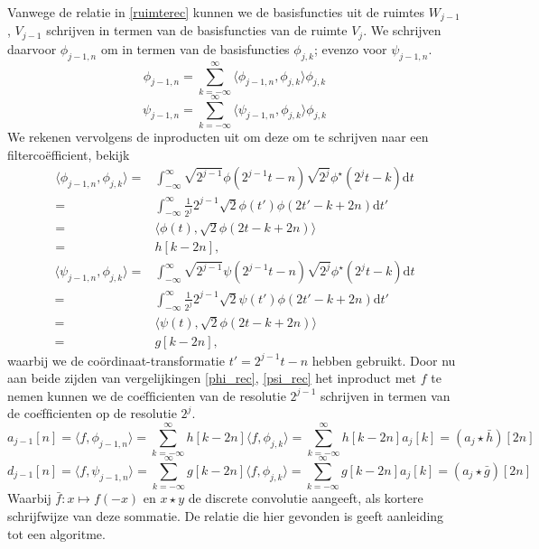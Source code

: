 \documentclass[11pt]{report}
\theoremstyle{plain}
\theoremstyle{remark}
\newcommand{\eq}[1]{\begin{eqnarray*} #1 \end{eqnarray*}}
\newcommand{\inpr}[2]{\langle #1 , #2 \rangle}
\renewcommand{\d}[1]{{\textrm{d} #1}}
\begin{document}
Vanwege de relatie in \ref{ruimterec} kunnen we de basisfuncties uit de ruimtes $W_{j-1}$,
$V_{j-1}$ schrijven in termen van de basisfuncties van de ruimte $V_j$.
We schrijven daarvoor $\phi_{j-1,n}$ om in termen van de basisfuncties $\phi_{j,k}$; evenzo
voor $\psi_{j-1,n}$.
\begin{equation}
\label{phi_rec}
\phi_{j-1,n} = \sum_{k=-\infty}^{\infty} \inpr{\phi_{j-1,n}}{\phi_{j,k}} \phi_{j,k}
\end{equation}
\begin{equation}
\label{psi_rec}
\psi_{j-1,n} = \sum_{k=-\infty}^{\infty} \inpr{\psi_{j-1,n}}{\phi_{j,k}} \phi_{j,k}
\end{equation}
We rekenen vervolgens de inproducten uit om deze om te schrijven naar een filterco\"efficient,
bekijk
\eq{
  \inpr{\phi_{j-1,n}}{\phi_{j,k}} 
  =& \int_{-\infty}^\infty \sqrt{2^{j-1}}\phi(2^{j-1}t -n) 
  \sqrt{2^{j}}\phi^\star(2^j t - k) \d{t}\\
  =& \int_{-\infty}^\infty \tfrac{1}{2^j} 2^{j-1} 
  \sqrt{2} \phi(t') \phi(2t' - k + 2n) \d{t'}\\
  =& \inpr{\phi(t)}{\sqrt{2}\phi(2t-k+2n)} \\
  =& h[k-2n],
}
\eq{
  \inpr{\psi_{j-1,n}}{\phi_{j,k}} 
  =& \int_{-\infty}^\infty \sqrt{2^{j-1}}\psi(2^{j-1}t -n) 
  \sqrt{2^{j}}\phi^\star(2^j t - k) \d{t}\\
  =& \int_{-\infty}^\infty \tfrac{1}{2^j} 2^{j-1} 
  \sqrt{2} \psi(t') \phi(2t' - k + 2n) \d{t'}\\
  =& \inpr{\psi(t)}{\sqrt{2}\phi(2t-k+2n)} \\
  =& g[k-2n],
}
waarbij we de co\"ordinaat-transformatie $t' = 2^{j-1}t - n$ hebben gebruikt.
Door nu aan beide zijden van vergelijkingen \ref{phi_rec}, \ref{psi_rec} het
inproduct met $f$ te nemen kunnen we de coe\"fficienten van de resolutie $2^{j-1}$ schrijven
in termen van de coe\"fficienten op de resolutie $2^j$.
\begin{equation}
\label{approx_rec}
a_{j-1}[n] = \inpr{f}{\phi_{j-1,n}} 
= \sum_{k=-\infty}^{\infty} h[k-2n] \inpr{f}{\phi_{j,k}}
= \sum_{k=-\infty}^\infty h[k-2n] a_{j}[k]
= (a_j \star \bar h)[2n]
\end{equation}
\begin{equation}
\label{detail_rec}
d_{j-1}[n] = \inpr{f}{\psi_{j-1,n}} 
= \sum_{k=-\infty}^{\infty} g[k-2n] \inpr{f}{\phi_{j,k}}
= \sum_{k=-\infty}^\infty g[k-2n] a_{j}[k] 
= (a_j \star \bar g)[2n]
\end{equation}
Waarbij $\bar f: x \mapsto f(-x)$ en $x\star y$ de discrete convolutie aangeeft, 
als kortere schrijfwijze van deze sommatie.
De relatie die hier gevonden is geeft aanleiding tot een algoritme.
\end{document}
